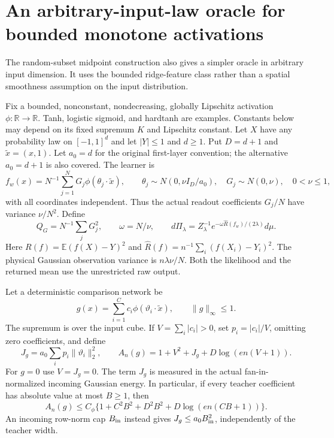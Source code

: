 \section{An arbitrary-input-law oracle for bounded monotone activations}
\label{sec:all-d-product-midpoint}
The random-subset midpoint construction also gives a simpler oracle in
arbitrary input dimension. It uses the bounded ridge-feature class rather
than a spatial smoothness assumption on the input distribution.

Fix a bounded, nonconstant, nondecreasing, globally Lipschitz activation
$\phi:\mathbb R\to\mathbb R$. Tanh, logistic sigmoid, and hardtanh are
examples. Constants below may depend on its fixed supremum $K$ and
Lipschitz constant. Let $X$ have any probability law on $[-1,1]^d$ and
let $|Y|\le1$ and $d\ge1$. Put $D=d+1$ and $\widetilde x=(x,1)$.
Let $a_0=d$ for the original first-layer convention; the alternative
$a_0=d+1$ is also covered. The learner is
\[
 f_w(x)=N^{-1}\sum_{j=1}^N G_j\phi(\theta_j\cdot\widetilde x),
 \qquad
 \theta_j\sim N(0,\nu I_D/a_0),\quad G_j\sim N(0,\nu),
 \quad0<\nu\le1,
\]
with all coordinates independent. Thus the actual readout coefficients
$G_j/N$ have variance $\nu/N^2$. Define
\[
 Q_G=N^{-1}\sum_jG_j^2,\qquad \omega=N/\nu,\qquad
 d\Pi_\lambda=Z_\lambda^{-1}
 e^{-\omega\widehat R(f_w)/(2\lambda)}d\mu.
\]
Here $R(f)=\mathbb E(f(X)-Y)^2$ and
$\widehat R(f)=n^{-1}\sum_i(f(X_i)-Y_i)^2$.
The physical Gaussian observation variance is $n\lambda\nu/N$.
Both the likelihood and the returned mean use the unrestricted raw output.

Let a deterministic comparison network be
\[
 g(x)=\sum_{i=1}^C c_i\phi(\vartheta_i\cdot\widetilde x),
 \qquad \|g\|_\infty\le1.
\]
The supremum is over the input cube. If $V=\sum_i|c_i|>0$, set
$p_i=|c_i|/V$, omitting zero coefficients, and define
\[
 J_g=a_0\sum_i p_i\|\vartheta_i\|_2^2,
 \qquad
 A_n(g)=1+V^2+J_g+D\log(e n(V+1)).                       \tag{AD1}
\]
For $g=0$ use $V=J_g=0$. The term $J_g$ is measured in the actual
fan-in-normalized incoming Gaussian energy. In particular, if every
teacher coefficient has absolute value at most $B\ge1$, then
\[
 A_n(g)\le C_\phi\{1+C^2B^2+D^2B^2+D\log(e n(CB+1))\}. \tag{AD2}
\]
An incoming row-norm cap $B_{\rm in}$ instead gives
$J_g\le a_0 B_{\rm in}^2$, independently of the teacher width.

